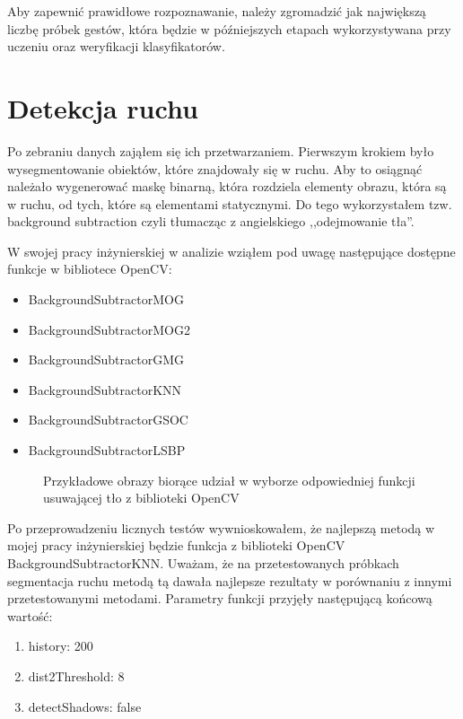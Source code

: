 \documentclass[a4paper,12pt,twoside,openany]{report}
\newcommand{\ImgPath}{.}
\begin{document}
Aby zapewnić prawidłowe rozpoznawanie, należy zgromadzić jak największą liczbę próbek gestów, która będzie w późniejszych etapach wykorzystywana przy uczeniu oraz weryfikacji klasyfikatorów.

\section{Detekcja ruchu}
Po zebraniu danych zająłem się ich przetwarzaniem. Pierwszym krokiem było wysegmentowanie obiektów, które znajdowały się w ruchu. Aby to osiągnąć należało wygenerować maskę binarną, która rozdziela elementy obrazu, która są w ruchu, od tych, które są elementami statycznymi. Do tego wykorzystałem tzw. background subtraction czyli tłumacząc z angielskiego ,,odejmowanie tła''.

W swojej pracy inżynierskiej w analizie wziąłem pod uwagę następujące dostępne funkcje w bibliotece OpenCV:

\begin{itemize} 
	\item BackgroundSubtractorMOG
	\item BackgroundSubtractorMOG2
	\item BackgroundSubtractorGMG
	\item BackgroundSubtractorKNN
	\item BackgroundSubtractorGSOC
	\item BackgroundSubtractorLSBP
\end{itemize} 

\begin{figure}[H]
	\centering
	\caption{Przykładowe obrazy biorące udział w wyborze odpowiedniej funkcji usuwającej tło z biblioteki OpenCV}
\end{figure}

Po przeprowadzeniu licznych testów wywnioskowałem, że najlepszą metodą w mojej pracy inżynierskiej będzie funkcja z biblioteki OpenCV BackgroundSubtractorKNN. Uważam, że na przetestowanych próbkach segmentacja ruchu metodą tą dawała najlepsze rezultaty w porównaniu z innymi przetestowanymi metodami. Parametry funkcji przyjęły następującą końcową wartość:
\begin{enumerate}
	\item history: 200
	\item dist2Threshold: 8
	\item detectShadows: false
\end{enumerate}
\end{document}
